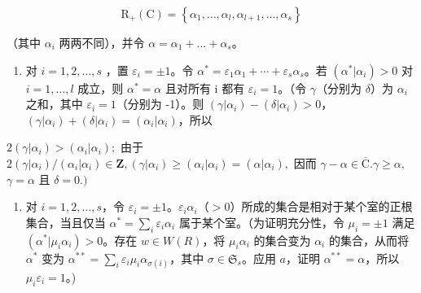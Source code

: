 \[
\mathrm{R} _ {+} (\mathrm{C}) = \left\{\alpha_ {1}, \dots , \alpha_ {l}, \alpha_ {l + 1}, \dots , \alpha_ {s} \right\}
\]

（其中 \(\alpha_{i}\) 两两不同），并令 \(\alpha = \alpha_{1} + \dots +\alpha_{s}\)。

\begin{enumerate}
\def\labelenumi{\alph{enumi})}
\tightlist
\item
  对 \(i = 1, 2, \ldots, s\) ，置 \(\varepsilon_{i} = \pm 1\)。令 \(\alpha^{*} = \varepsilon_{1}\alpha_{1} + \cdots + \varepsilon_{s}\alpha_{s}\)。若 \((\alpha^{*}|\alpha_{i}) > 0\) 对 \(i = 1, \ldots, l\) 成立，则 \(\alpha^{*} = \alpha\) 且对所有 i 都有 \(\varepsilon_{i} = 1\)。（令 \(\gamma\)（分别为 \(\delta\)）为 \(\alpha_{i}\) 之和，其中 \(\varepsilon_{i} = 1\)（分别为 -1）。则 \((\gamma|\alpha_{i}) - (\delta|\alpha_{i}) > 0\)，\((\gamma|\alpha_{i}) + (\delta|\alpha_{i}) = (\alpha_{i}|\alpha_{i})\)，所以
\end{enumerate}

\(2(\gamma|\alpha_{i})>(\alpha_{i}|\alpha_{i});\) 由于 \(2(\gamma|\alpha_{i}) / (\alpha_{i}|\alpha_{i})\in \mathbf{Z},(\gamma |\alpha_{i})\geqslant (\alpha_{i}|\alpha_{i}) = (\alpha |\alpha_{i}),\) 因而 \(\gamma -\alpha \in \overline{\mathrm{C}}. \gamma \geqslant \alpha ,\) \(\gamma = \alpha\) 且 \(\delta = 0.)\)

\begin{enumerate}
\def\labelenumi{\alph{enumi})}
\setcounter{enumi}{1}
\tightlist
\item
  对 \(i = 1,2,\ldots,s\)，令 \(\varepsilon_{i} = \pm 1\)。\(\varepsilon_{i}\alpha_{i}\)（\(>0\)）所成的集合是相对于某个室的正根集合，当且仅当 \(\alpha^{*} = \sum_{i}\varepsilon_{i}\alpha_{i}\) 属于某个室。（为证明充分性，令 \(\mu_{i} = \pm 1\) 满足 \((\alpha^{*}|\mu_{i}\alpha_{i}) > 0\)。存在 \(w\in W(R)\)，将 \(\mu_{i}\alpha_{i}\) 的集合变为 \(\alpha_{i}\) 的集合，从而将 \(\alpha^{*}\) 变为 \(\alpha^{**} = \sum_{i}\varepsilon_{i}\mu_{i}\alpha_{\sigma(i)}\)，其中 \(\sigma \in \mathfrak{S}_s\)。应用 \(a\)，证明 \(\alpha^{**} = \alpha\)，所以 \(\mu_{i}\varepsilon_{i} = 1\)。)
\end{enumerate}

